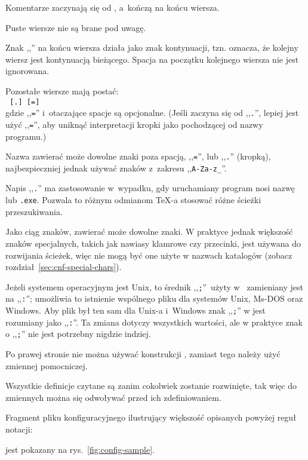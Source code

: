 \documentclass{article}
\renewcommand{\samp}[1]{,,\texttt{#1}''}  %
\begin{document}
\begin{itemize*}
\item
  Komentarze zaczynają się  od \code{\%}, a~kończą   na końcu wiersza.
\item
  Puste wiersze nie są brane pod uwagę.
\item
  Znak ,,\bs{}'' na końcu wiersza działa jako znak kontynuacji, tzn.
  oznacza, że kolejny wiersz jest kontynuacją bieżącego.
  Spacja na początku kolejnego wiersza nie jest ignorowana.
\item
  Pozostałe wiersze mają postać:\\
 \hspace*{2em}\texttt{ \textrm{[}.\textrm{]}
  \textrm{[}=\textrm{]} }\\[1pt]
  gdzie \samp{=} i~otaczające spacje są opcjonalne. (Jeśli  zaczyna się od \samp{.}, lepiej jest użyć
   \samp{=}, aby uniknąć interpretacji kropki jako pochodzącej od nazwy programu.)
\item
Nazwa   zawierać może dowolne znaki poza spacją,
  \samp{=}, lub \samp{.} (kropką), najbezpieczniej jednak używać znaków
  z~zakresu \samp{A-Za-z\_}.
\item
  Napis \samp{.} ma zastosowanie w~wypadku, gdy
  uruchamiany program nosi nazwę \texttt{} lub
  \texttt{.exe}. Pozwala to różnym odmianom \TeX-a stosować
  różne ścieżki przeszukiwania.
\item Jako ciąg znaków,  zawierać może dowolne znaki.
W praktyce jednak większość znaków specjalnych, takich jak nawiasy klamrowe czy przecinki, jest używana do rozwijania ścieżek, więc nie mogą być one użyte w nazwach katalogów
(zobacz rozdział~\ref{sec:cnf-special-chars}).

   Jeżeli systemem operacyjnym jest Unix,
  to średnik \samp{;}\ użyty w~ zamieniany jest na
  \samp{:};  umożliwia to istnienie
  wspólnego pliku  dla systemów  Unix, Ms-DOS oraz Windows.
  Aby   plik  był ten sam dla  Unix-a i~Windows znak \samp{;} w  jest rozumiany jako \samp{:}.   Ta zmiana dotyczy wszystkich wartości, ale w praktyce znak o  \samp{;} nie jest potrzebny nigdzie indziej.

Po prawej stronie nie można używać konstrukcji
  , zamiast tego należy użyć zmiennej pomocniczej.


\item
  Wszystkie definicje czytane są zanim cokolwiek zostanie rozwinięte, tak
  więc do zmiennych można się  odwoływać przed ich zdefiniowaniem.
\end{itemize*}
Fragment pliku konfiguracyjnego ilustrujący większość opisanych powyżej
reguł notacji:
\ifSingleColumn

\else
jest pokazany na rys.~\ref{fig:config-sample}.
\fi
\end{document}
